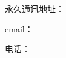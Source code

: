 \begin{correspondingaddr}
  \heiti\xiaosi
  \noindent 永久通讯地址：　\par
  \noindent email：　\par
  \noindent 电话：　\par
\end{correspondingaddr}
